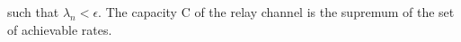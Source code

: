 \documentclass[preview]{standalone}
\begin{document}
\begin{center}
such that $\lambda_n < \epsilon$. The capacity C of the relay channel is the supremum of the set of achievable rates.
\end{center}
\end{document}
